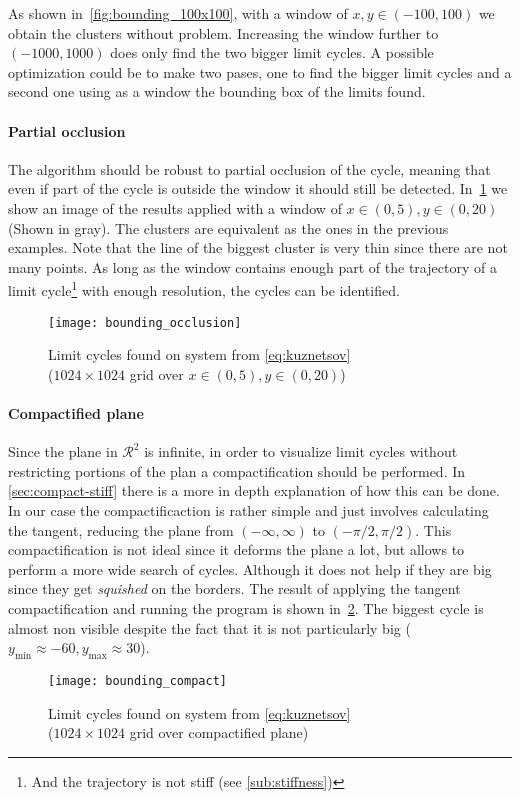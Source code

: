As shown in~\cref{fig:bounding_100x100}, with a window of $x,y \in (-100,100)$
we obtain the clusters without problem. Increasing the window further to
$(-1000, 1000)$ does only find the two bigger limit cycles. A possible optimization
could be to make two pases, one to find the bigger limit cycles and a second one using
as a window the bounding box of the limits found.

\pagebreak
\paragraph{Partial occlusion}

The algorithm should be robust to partial occlusion of the cycle, meaning that
even if part of the cycle is outside the window it should still be detected.
In~\cref{fig:bounding_occ} we show an image of the results applied with a window
of $x \in (0, 5), y \in (0, 20)$ (Shown in gray). The clusters are equivalent as
the ones in the previous examples. Note that the line of the biggest cluster is very thin
since there are not many points. As long as the window contains enough part of the trajectory of
a limit cycle\footnote{And the trajectory is not stiff (see \cref{sub:stiffness})} with
enough resolution, the cycles can be identified.

\begin{figure}[H]
    \centering
    \texttt{[image: bounding\_occlusion]}
    \caption{Limit cycles found on system from \cref{eq:kuznetsov} \\
        ($1024 \times 1024$ grid over $x \in (0, 5), y \in (0, 20)$)
    }%
    \label{fig:bounding_occ}
\end{figure}

\pagebreak
\paragraph{Compactified plane}

Since the plane in $\mathcal{R}^2$ is infinite, in order to visualize limit cycles without
restricting portions of the plan a compactification should be performed.
In \cref{sec:compact-stiff} there is a more in depth explanation of how this can be done. In
our case the compactificaction is rather simple and just involves calculating the tangent,
reducing the plane from $(-\infty, \infty)$  to $(-\pi/2, \pi/2)$. This compactification is
not ideal since it deforms the plane a lot, but allows to perform a more wide search of cycles.
Although it does not help if they are big since they get \emph{squished} on the borders. The
result of applying the tangent compactification and running the program is shown
in~\cref{fig:bounding_compact}. The biggest cycle is almost non visible despite the fact that
it is not particularly big ($y_{\min} \approx -60, y_{\max} \approx 30$).

\begin{figure}[H]
    \centering
    \texttt{[image: bounding\_compact]}
    \caption{Limit cycles found on system from \cref{eq:kuznetsov} \\
        ($1024 \times 1024$ grid over compactified plane)
    }%
    \label{fig:bounding_compact}
\end{figure}
